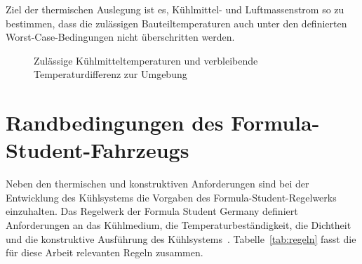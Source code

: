 Ziel der thermischen Auslegung ist es, Kühlmittel- und Luftmassenstrom so zu
bestimmen, dass die zulässigen Bauteiltemperaturen auch unter den definierten
Worst-Case-Bedingungen nicht überschritten werden.

\begin{figure}[htb]
  \centering
  \caption{Zulässige Kühlmitteltemperaturen und verbleibende Temperaturdifferenz zur Umgebung}
  \label{fig:temperaturgrenzen}
\end{figure}


\section{Randbedingungen des Formula-Student-Fahrzeugs}
\label{sec:randbedingungen}

Neben den thermischen und konstruktiven Anforderungen sind bei der Entwicklung
des Kühlsystems die Vorgaben des Formula-Student-Regelwerks einzuhalten. Das
Regelwerk der Formula Student Germany definiert Anforderungen an das
Kühlmedium, die Temperaturbeständigkeit, die Dichtheit und die konstruktive
Ausführung des Kühlsystems~\cite{fsg_rules}. Tabelle~\ref{tab:regeln} fasst die
für diese Arbeit relevanten Regeln zusammen.

